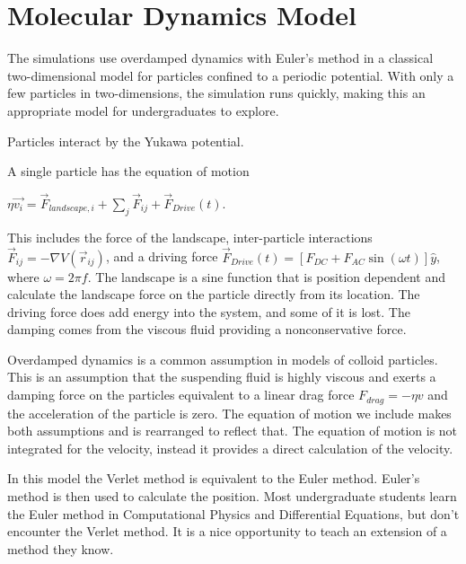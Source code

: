 \documentclass[prb,preprint]{revtex4}
\begin{document}

\section{Molecular Dynamics Model}
\label{sec:MD}
The simulations use overdamped dynamics with Euler's method in a classical two-dimensional model for particles confined to a periodic potential. With only a few particles in two-dimensions, the simulation runs quickly, making this an appropriate model for undergraduates to explore.

Particles interact by the Yukawa potential.

A single particle has the equation of motion 
\begin{center}
$\eta \vec{v_i} = \vec{F}_{landscape,i} + \sum_{j}^{} \vec{F}_{ij} + \vec{F}_{Drive}(t)$.\\ 
\end{center}
This includes the force of the landscape, inter-particle interactions $\vec{F}_{ij} = - \nabla V(\vec{r}_{ij})$, and a driving force $\vec{F}_{Drive}(t) = [F_{DC} + F_{AC} \sin(\omega t)] \hat{y}$, where $\omega = 2 \pi f$. The landscape is a sine function that is position dependent and calculate the landscape force on the particle directly from its location. The driving force does add energy into the system, and some of it is lost. The damping comes from the viscous fluid providing a nonconservative force.

Overdamped dynamics is a common assumption in models of colloid particles. This is an assumption that the suspending fluid is highly viscous and exerts a damping force on the particles equivalent to a linear drag force $F_{drag} = - \eta v$ and the acceleration of the particle is zero. The equation of motion we include makes both assumptions and is rearranged to reflect that. The equation of motion is not integrated for the velocity, instead it provides a direct calculation of the velocity.  

In this model the Verlet method is equivalent to the Euler method.  Euler's method is then used to calculate the position. Most undergraduate students learn the Euler method in Computational Physics and Differential Equations, but don't encounter the Verlet method. It is a nice opportunity to teach an extension of a method they know. 

\end{document}

